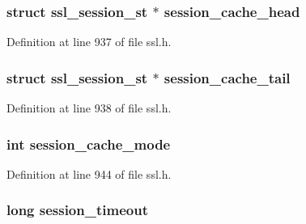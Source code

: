 \subsubsection[{\texorpdfstring{session\+\_\+cache\+\_\+head}{session_cache_head}}]{\setlength{\rightskip}{0pt plus 5cm}struct {\bf ssl\+\_\+session\+\_\+st} $\ast$ session\+\_\+cache\+\_\+head}\hypertarget{structssl__ctx__st_acf8f625fb4d669eec6a3d83ad8a63b96}{}\label{structssl__ctx__st_acf8f625fb4d669eec6a3d83ad8a63b96}


Definition at line 937 of file ssl.\+h.

\subsubsection[{\texorpdfstring{session\+\_\+cache\+\_\+tail}{session_cache_tail}}]{\setlength{\rightskip}{0pt plus 5cm}struct {\bf ssl\+\_\+session\+\_\+st} $\ast$ session\+\_\+cache\+\_\+tail}\hypertarget{structssl__ctx__st_a167a310ce34e71f055f69422c0ae4a92}{}\label{structssl__ctx__st_a167a310ce34e71f055f69422c0ae4a92}


Definition at line 938 of file ssl.\+h.

\subsubsection[{\texorpdfstring{session\+\_\+cache\+\_\+mode}{session_cache_mode}}]{\setlength{\rightskip}{0pt plus 5cm}int session\+\_\+cache\+\_\+mode}\hypertarget{structssl__ctx__st_afa451b2723813ae5d7fc8506270df689}{}\label{structssl__ctx__st_afa451b2723813ae5d7fc8506270df689}


Definition at line 944 of file ssl.\+h.

\subsubsection[{\texorpdfstring{session\+\_\+timeout}{session_timeout}}]{\setlength{\rightskip}{0pt plus 5cm}long session\+\_\+timeout}\hypertarget{structssl__ctx__st_a8cf95f7b91066a57849b1eeec3657e4e}{}\label{structssl__ctx__st_a8cf95f7b91066a57849b1eeec3657e4e}


